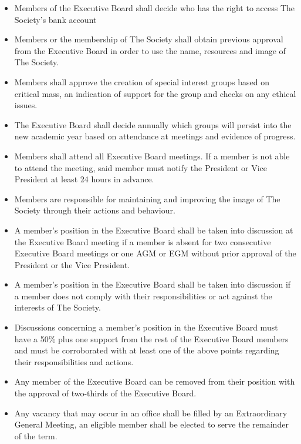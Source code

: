 \begin{itemize}

    \item{Members of the Executive Board shall decide who has the right to access The Society’s bank account}

    \item{Members or the membership of The Society shall obtain previous approval from the Executive Board in order to use the name, resources and image of The Society.}

    \item{Members shall approve the creation of special interest groups based on critical mass, an indication of support for the group and checks on any ethical issues.}

    \item{The Executive Board shall decide annually which groups will persist into the new academic year based on attendance at meetings and evidence of progress.}

    \item{Members shall attend all Executive Board meetings. If a member is not able to attend the meeting, said member must notify the President or Vice President at least 24 hours in advance.}

    \item{Members are responsible for maintaining and improving the image of The Society through their actions and behaviour.}

    \item{A member's position in the Executive Board shall be taken into discussion at the Executive Board meeting if a member is absent for two consecutive Executive Board meetings or one AGM or EGM without prior approval of the President or the Vice President.}

    \item{A member's position in the Executive Board shall be taken into discussion if a member does not comply with their responsibilities or act against the interests of The Society.}

    \item{Discussions concerning a member's position in the Executive Board must have a 50\% plus one support from the rest of the Executive Board members and must be corroborated with at least one of the above points regarding their responsibilities and actions.}

    \item{Any member of the Executive Board can be removed from their position with the approval of two-thirds of the Executive Board.}

    \item{Any vacancy that may occur in an office shall be filled by an Extraordinary General Meeting, an eligible member shall be elected to serve the remainder of the term. }

\end{itemize}


